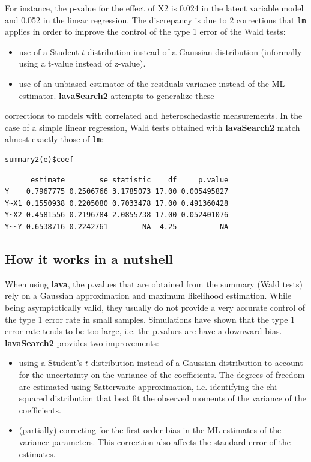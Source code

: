 \documentclass[12pt]{article}
\begin{document}
For instance, the p-value for the effect of X2 is 0.024 in the latent
variable model and 0.052 in the linear regression. The discrepancy is
due to 2 corrections that \texttt{lm} applies in order to improve the control
of the type 1 error of the Wald tests:
\begin{itemize}
\item use of a Student \(t\)-distribution instead of a Gaussian
distribution (informally using a t-value instead of z-value).
\item use of an unbiased estimator of the residuals variance instead of
the ML-estimator.  \textbf{lavaSearch2} attempts to generalize these
\end{itemize}
corrections to models with correlated and heteroschedastic
measurements. In the case of a simple linear regression, Wald tests
obtained with \textbf{lavaSearch2} match almost exactly those of \texttt{lm}:
\lstset{language=r,label= ,caption= ,captionpos=b,numbers=none}
\begin{lstlisting}
summary2(e)$coef
\end{lstlisting}

\begin{verbatim}
      estimate        se statistic    df     p.value
Y    0.7967775 0.2506766 3.1785073 17.00 0.005495827
Y~X1 0.1550938 0.2205080 0.7033478 17.00 0.491360428
Y~X2 0.4581556 0.2196784 2.0855738 17.00 0.052401076
Y~~Y 0.6538716 0.2242761        NA  4.25          NA
\end{verbatim}

\subsection{How it works in a nutshell}
\label{sec:org9da7fb3}

When using \textbf{lava}, the p.values that are obtained from the summary
(Wald tests) rely on a Gaussian approximation and maximum likelihood
estimation. While being asymptotically valid, they usually do not
provide a very accurate control of the type 1 error rate in small
samples. Simulations have shown that the type 1 error rate tends to be
too large, i.e. the p.values are have a downward bias. \textbf{lavaSearch2}
provides two improvements:
\begin{itemize}
\item using a Student's \(t\)-distribution instead of a Gaussian
distribution to account for the uncertainty on the variance of the
coefficients. The degrees of freedom are estimated using Satterwaite
approximation, i.e. identifying the chi-squared distribution that
best fit the observed moments of the variance of the coefficients.
\item (partially) correcting for the first order bias in the ML estimates
of the variance parameters. This correction also affects the
standard error of the estimates.
\end{itemize}
\end{document}
